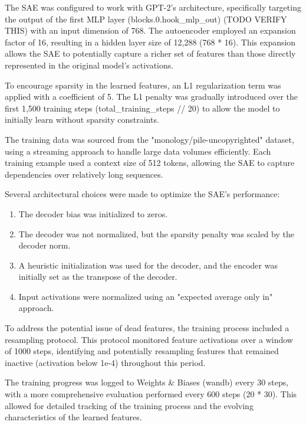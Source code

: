 The SAE was configured to work with GPT-2's architecture, specifically targeting the output of the first MLP layer (blocks.0.hook\_mlp\_out) (TODO VERIFY THIS) with an input dimension of 768. The autoencoder employed an expansion factor of 16, resulting in a hidden layer size of 12,288 (768 * 16). This expansion allows the SAE to potentially capture a richer set of features than those directly represented in the original model's activations.

To encourage sparsity in the learned features, an L1 regularization term was applied with a coefficient of 5. The L1 penalty was gradually introduced over the first 1,500 training steps (total\_training\_steps // 20) to allow the model to initially learn without sparsity constraints.

The training data was sourced from the "monology/pile-uncopyrighted" dataset, using a streaming approach to handle large data volumes efficiently. Each training example used a context size of 512 tokens, allowing the SAE to capture dependencies over relatively long sequences.

Several architectural choices were made to optimize the SAE's performance:

\begin{enumerate}
    \item The decoder bias was initialized to zeros.
    
    \item The decoder was not normalized, but the sparsity penalty was scaled by the decoder norm.
    
    \item A heuristic initialization was used for the decoder, and the encoder was initially set as the transpose of the decoder.
    
    \item Input activations were normalized using an "expected average only in" approach.
\end{enumerate}

To address the potential issue of dead features, the training process included a resampling protocol. This protocol monitored feature activations over a window of 1000 steps, identifying and potentially resampling features that remained inactive (activation below 1e-4) throughout this period.

The training progress was logged to Weights \& Biases (wandb) every 30 steps, with a more comprehensive evaluation performed every 600 steps (20 * 30). This allowed for detailed tracking of the training process and the evolving characteristics of the learned features.

